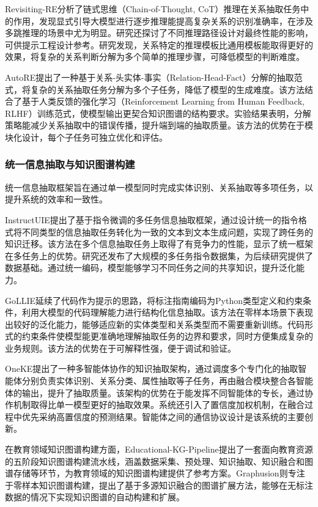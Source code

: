 Revisiting-RE\cite{revisiting_re_2023}分析了链式思维（Chain-of-Thought, CoT）推理在关系抽取任务中的作用，发现显式引导大模型进行逐步推理能提高复杂关系的识别准确率，在涉及多跳推理的场景中尤为明显。研究还探讨了不同推理路径设计对最终性能的影响，可供提示工程设计参考。研究发现，关系特定的推理模板比通用模板能取得更好的效果，将复杂的关系判断分解为多个简单的推理步骤，可降低模型的判断难度。

AutoRE\cite{auto_re_2024}提出了一种基于关系-头实体-事实（Relation-Head-Fact）分解的抽取范式，将复杂的关系抽取任务分解为多个子任务，降低了模型的生成难度。该方法结合了基于人类反馈的强化学习（Reinforcement Learning from Human Feedback, RLHF）训练范式，使模型输出更契合知识图谱的结构要求。实验结果表明，分解策略能减少关系抽取中的错误传播，提升端到端的抽取质量。该方法的优势在于模块化设计，每个子任务可独立优化和评估。

\subsubsection{统一信息抽取与知识图谱构建}

统一信息抽取框架旨在通过单一模型同时完成实体识别、关系抽取等多项任务，以提升系统的效率和一致性。

InstructUIE\cite{instructuie_2023}提出了基于指令微调的多任务信息抽取框架，通过设计统一的指令格式将不同类型的信息抽取任务转化为一致的文本到文本生成问题，实现了跨任务的知识迁移。该方法在多个信息抽取任务上取得了有竞争力的性能，显示了统一框架在多任务上的优势。研究还发布了大规模的多任务指令数据集，为后续研究提供了数据基础。通过统一编码，模型能够学习不同任务之间的共享知识，提升泛化能力。

GoLLIE\cite{gollie_2023}延续了代码作为提示的思路，将标注指南编码为Python类型定义和约束条件，利用大模型的代码理解能力进行结构化信息抽取。该方法在零样本场景下表现出较好的泛化能力，能够适应新的实体类型和关系类型而不需要重新训练。代码形式的约束条件使模型能更准确地理解抽取任务的边界和要求，同时方便集成复杂的业务规则。该方法的优势在于可解释性强，便于调试和验证。

OneKE\cite{oneke_2025}提出了一种多智能体协作的知识抽取架构，通过调度多个专门化的抽取智能体分别负责实体识别、关系分类、属性抽取等子任务，再由融合模块整合各智能体的输出，提升了抽取质量。该架构的优势在于能发挥不同智能体的专长，通过协作机制取得比单一模型更好的抽取效果。系统还引入了置信度加权机制，在融合过程中优先采纳高置信度的预测结果。智能体之间的通信协议设计是该系统的主要创新。

在教育领域知识图谱构建方面，Educational-KG-Pipeline\cite{educational_kg_pipeline_2025}提出了一套面向教育资源的五阶段知识图谱构建流水线，涵盖数据采集、预处理、知识抽取、知识融合和图谱存储等环节，为教育领域的知识图谱构建提供了参考方案。Graphusion\cite{graphusion_2024}则专注于零样本知识图谱构建，提出了基于多源知识融合的图谱扩展方法，能够在无标注数据的情况下实现知识图谱的自动构建和扩展。

